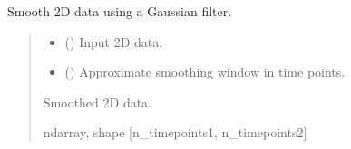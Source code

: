 \documentclass[letterpaper,10pt,english]{sphinxhowto}
\begin{document}
\begin{fulllineitems}
\label{\detokenize{stuff:neurora.stuff.smooth_2d_gaussian}}
\pysigstartsignatures
{}
\pysigstopsignatures
\sphinxAtStartPar
Smooth 2\sphinxhyphen{}D data using a Gaussian filter.
\begin{quote}\begin{description}
\begin{itemize}
\item {} 
\sphinxAtStartPar
{} (\sphinxstyleliteralemphasis{\sphinxupquote{, }}\sphinxstyleliteralemphasis{\sphinxupquote{ {[}}}\sphinxstyleliteralemphasis{\sphinxupquote{, }}\sphinxstyleliteralemphasis{\sphinxupquote{{]}}}) \textendash{} Input 2\sphinxhyphen{}D data.

\item {} 
\sphinxAtStartPar
{} (\sphinxstyleliteralemphasis{\sphinxupquote{, }}) \textendash{} Approximate smoothing window in time points.

\end{itemize}

\sphinxAtStartPar
{} \textendash{} Smoothed 2\sphinxhyphen{}D data.

\sphinxAtStartPar
ndarray, shape {[}n\_timepoints1, n\_timepoints2{]}

\end{description}\end{quote}

\end{fulllineitems}




\renewcommand{\indexname}{Index}
\printindex
\end{document}
